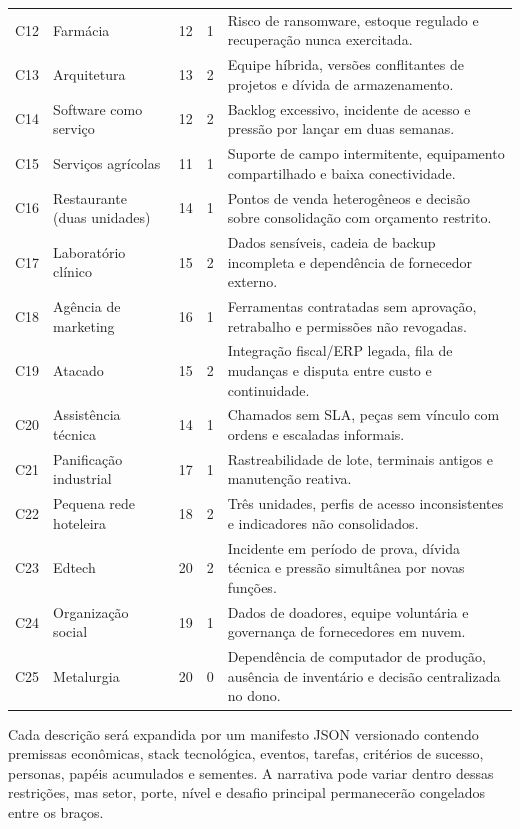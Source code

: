 \begin{longtable}{@{}L{0.8cm}L{2.8cm}L{1.0cm}L{1.0cm}L{7.0cm}@{}}
  C12 & Farmácia & 12 & 1 & Risco de ransomware, estoque regulado e recuperação nunca exercitada. \\
  C13 & Arquitetura & 13 & 2 & Equipe híbrida, versões conflitantes de projetos e dívida de armazenamento. \\
  C14 & Software como serviço & 12 & 2 & Backlog excessivo, incidente de acesso e pressão por lançar em duas semanas. \\
  C15 & Serviços agrícolas & 11 & 1 & Suporte de campo intermitente, equipamento compartilhado e baixa conectividade. \\
  \pagebreak
  C16 & Restaurante (duas unidades) & 14 & 1 & Pontos de venda heterogêneos e decisão sobre consolidação com orçamento restrito. \\
  C17 & Laboratório clínico & 15 & 2 & Dados sensíveis, cadeia de backup incompleta e dependência de fornecedor externo. \\
  C18 & Agência de marketing & 16 & 1 & Ferramentas contratadas sem aprovação, retrabalho e permissões não revogadas. \\
  C19 & Atacado & 15 & 2 & Integração fiscal/ERP legada, fila de mudanças e disputa entre custo e continuidade. \\
  C20 & Assistência técnica & 14 & 1 & Chamados sem SLA, peças sem vínculo com ordens e escaladas informais. \\
  C21 & Panificação industrial & 17 & 1 & Rastreabilidade de lote, terminais antigos e manutenção reativa. \\
  C22 & Pequena rede hoteleira & 18 & 2 & Três unidades, perfis de acesso inconsistentes e indicadores não consolidados. \\
  C23 & Edtech & 20 & 2 & Incidente em período de prova, dívida técnica e pressão simultânea por novas funções. \\
  C24 & Organização social & 19 & 1 & Dados de doadores, equipe voluntária e governança de fornecedores em nuvem. \\
  C25 & Metalurgia & 20 & 0 & Dependência de computador de produção, ausência de inventário e decisão centralizada no dono. \\
  \bottomrule
\end{longtable}

Cada descrição será expandida por um manifesto JSON versionado contendo premissas econômicas, stack tecnológica, eventos, tarefas, critérios de sucesso, personas, papéis acumulados e sementes. A narrativa pode variar dentro dessas restrições, mas setor, porte, nível e desafio principal permanecerão congelados entre os braços.
\endgroup
